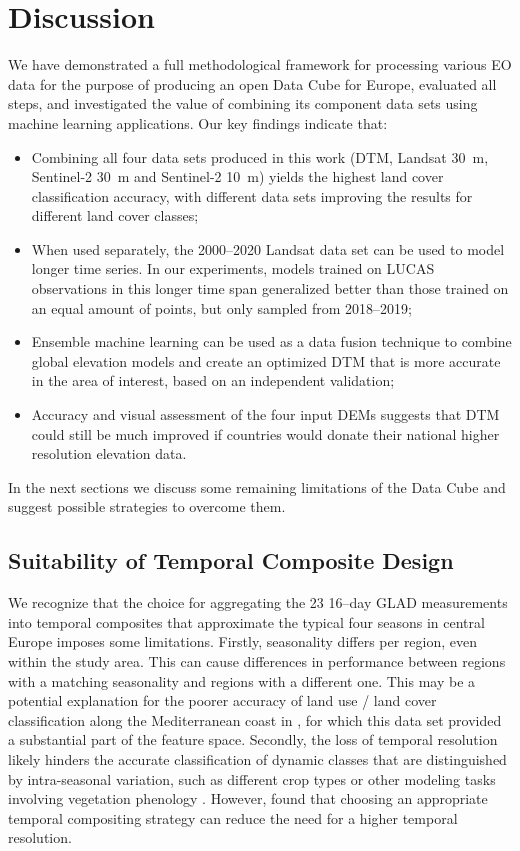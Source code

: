 
\section*{Discussion}

We have demonstrated a full methodological framework for processing various EO data for the purpose of producing an open Data Cube for Europe, evaluated all steps, and investigated the value of combining its component data sets using machine learning applications. Our key findings indicate that:
\begin{itemize}[noitemsep]
\item Combining all four data sets produced in this work (DTM, Landsat 30~m, Sentinel-2 30~m and Sentinel-2 10~m) yields the highest land cover classification accuracy, with different data sets improving the results for different land cover classes;
\item When used separately, the 2000--2020 Landsat data set can be used to model longer time series. In our experiments, models trained on LUCAS observations in this longer time span generalized better than those trained on an equal amount of points, but only sampled from 2018--2019;
\item Ensemble machine learning can be used as a data fusion technique to combine global elevation models and create an optimized DTM that is more accurate in the area of interest, based on an independent validation;
\item Accuracy and visual assessment of the four input DEMs suggests that DTM could still be much improved if countries would donate their national higher resolution elevation data.
\end{itemize}

In the next sections we discuss some remaining limitations of the Data Cube and suggest possible strategies to overcome them.

\subsection*{Suitability of Temporal Composite Design}

We recognize that the choice for aggregating the 23 {\texttimes} 16--day GLAD measurements into temporal composites that approximate the typical four seasons in central Europe imposes some limitations. Firstly, seasonality differs per region, even within the study area. This can cause differences in performance between regions with a matching seasonality and regions with a different one. This may be a potential explanation for the poorer accuracy of land use / land cover classification along the Mediterranean coast in \citet{witjes2022spatiotemporal}, for which this data set provided a substantial part of the feature space. Secondly, the loss of temporal resolution likely hinders the accurate classification of dynamic classes that are distinguished by intra-seasonal variation, such as different crop types \citep{vuolo2018much} or other modeling tasks involving vegetation phenology \citep{zhao2011evaluation}. However, \citet{zhao2022temporal} found that choosing an appropriate temporal compositing strategy can reduce the need for a higher temporal resolution.

